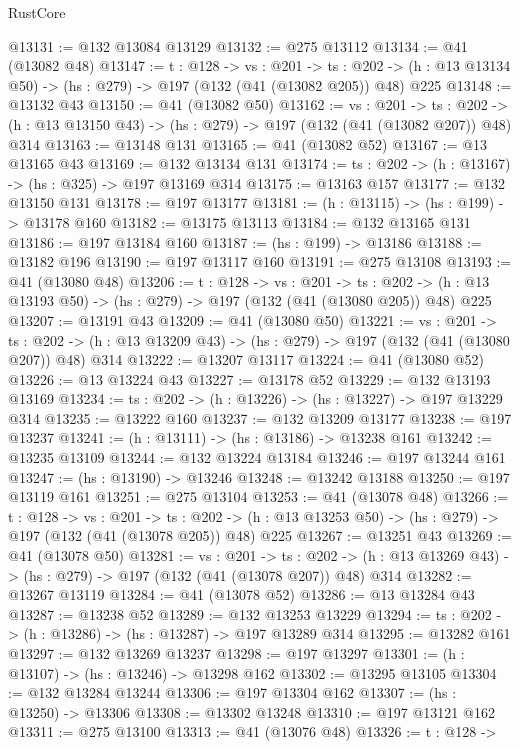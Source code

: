 \begin{lexlean}{RustCore}
\begin{coremodule}
@13131 := @132 @13084 @13129
@13132 := @275 @13112
@13134 := @41 (@13082 @48)
@13147 := {t : @128} ->
  {vs : @201} ->
  {ts : @202} -> (h : @13 @13134 @50) -> (hs : @279) -> @197 (@132 (@41 (@13082 @205)) @48) @225
@13148 := @13132 @43
@13150 := @41 (@13082 @50)
@13162 := {vs : @201} ->
  {ts : @202} -> (h : @13 @13150 @43) -> (hs : @279) -> @197 (@132 (@41 (@13082 @207)) @48) @314
@13163 := @13148 @131
@13165 := @41 (@13082 @52)
@13167 := @13 @13165 @43
@13169 := @132 @13134 @131
@13174 := {ts : @202} -> (h : @13167) -> (hs : @325) -> @197 @13169 @314
@13175 := @13163 @157
@13177 := @132 @13150 @131
@13178 := @197 @13177
@13181 := (h : @13115) -> (hs : @199) -> @13178 @160
@13182 := @13175 @13113
@13184 := @132 @13165 @131
@13186 := @197 @13184 @160
@13187 := (hs : @199) -> @13186
@13188 := @13182 @196
@13190 := @197 @13117 @160
@13191 := @275 @13108
@13193 := @41 (@13080 @48)
@13206 := {t : @128} ->
  {vs : @201} ->
  {ts : @202} -> (h : @13 @13193 @50) -> (hs : @279) -> @197 (@132 (@41 (@13080 @205)) @48) @225
@13207 := @13191 @43
@13209 := @41 (@13080 @50)
@13221 := {vs : @201} ->
  {ts : @202} -> (h : @13 @13209 @43) -> (hs : @279) -> @197 (@132 (@41 (@13080 @207)) @48) @314
@13222 := @13207 @13117
@13224 := @41 (@13080 @52)
@13226 := @13 @13224 @43
@13227 := @13178 @52
@13229 := @132 @13193 @13169
@13234 := {ts : @202} -> (h : @13226) -> (hs : @13227) -> @197 @13229 @314
@13235 := @13222 @160
@13237 := @132 @13209 @13177
@13238 := @197 @13237
@13241 := (h : @13111) -> (hs : @13186) -> @13238 @161
@13242 := @13235 @13109
@13244 := @132 @13224 @13184
@13246 := @197 @13244 @161
@13247 := (hs : @13190) -> @13246
@13248 := @13242 @13188
@13250 := @197 @13119 @161
@13251 := @275 @13104
@13253 := @41 (@13078 @48)
@13266 := {t : @128} ->
  {vs : @201} ->
  {ts : @202} -> (h : @13 @13253 @50) -> (hs : @279) -> @197 (@132 (@41 (@13078 @205)) @48) @225
@13267 := @13251 @43
@13269 := @41 (@13078 @50)
@13281 := {vs : @201} ->
  {ts : @202} -> (h : @13 @13269 @43) -> (hs : @279) -> @197 (@132 (@41 (@13078 @207)) @48) @314
@13282 := @13267 @13119
@13284 := @41 (@13078 @52)
@13286 := @13 @13284 @43
@13287 := @13238 @52
@13289 := @132 @13253 @13229
@13294 := {ts : @202} -> (h : @13286) -> (hs : @13287) -> @197 @13289 @314
@13295 := @13282 @161
@13297 := @132 @13269 @13237
@13298 := @197 @13297
@13301 := (h : @13107) -> (hs : @13246) -> @13298 @162
@13302 := @13295 @13105
@13304 := @132 @13284 @13244
@13306 := @197 @13304 @162
@13307 := (hs : @13250) -> @13306
@13308 := @13302 @13248
@13310 := @197 @13121 @162
@13311 := @275 @13100
@13313 := @41 (@13076 @48)
@13326 := {t : @128} ->

\end{coremodule}
\end{lexlean}
